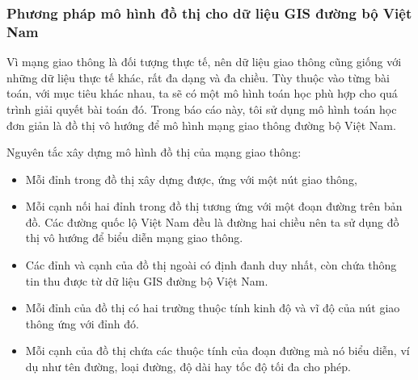 \documentclass[14pt, oneside, a4paper, openany]{scrartcl}
\begin{document}
\subsubsection{Phương pháp mô hình đồ thị cho dữ liệu GIS đường bộ Việt Nam}
Vì mạng giao thông là đối tượng thực tế, nên dữ liệu giao thông cũng giống với những dữ liệu thực tế khác, rất đa dạng và đa chiều. 
Tùy thuộc vào từng bài toán, với mục tiêu khác nhau, ta sẽ có một mô hình toán học phù hợp cho quá trình giải quyết bài toán đó.
Trong báo cáo này, tôi sử dụng mô hình toán học đơn giản là đồ thị vô hướng để mô hình mạng giao thông đường bộ Việt Nam. 

Nguyên tắc xây dựng mô hình đồ thị của mạng giao thông:
\begin{itemize}
	\item Mỗi đỉnh trong đồ thị xây dựng được, ứng với một nút giao thông,
	\item Mỗi cạnh nối hai đỉnh trong đồ thị tương ứng với một đoạn đường trên bản đồ. Các đường quốc lộ Việt Nam đều là đường hai chiều nên ta sử dụng đồ thị vô hướng để biểu diễn mạng giao thông.
	\item Các đỉnh và cạnh của đồ thị ngoài có định đanh duy nhất, còn chứa thông tin thu được từ dữ liệu GIS đường bộ Việt Nam.
	\item Mỗi đỉnh của đồ thị có hai trường thuộc tính kinh độ và vĩ độ của nút giao thông ứng với đỉnh đó.
	\item Mỗi cạnh của đồ thị chứa các thuộc tính của đoạn đường mà nó biểu diễn, ví dụ như tên đường, loại đường, độ dài hay tốc độ tối đa cho phép.
\end{itemize}
\end{document}
